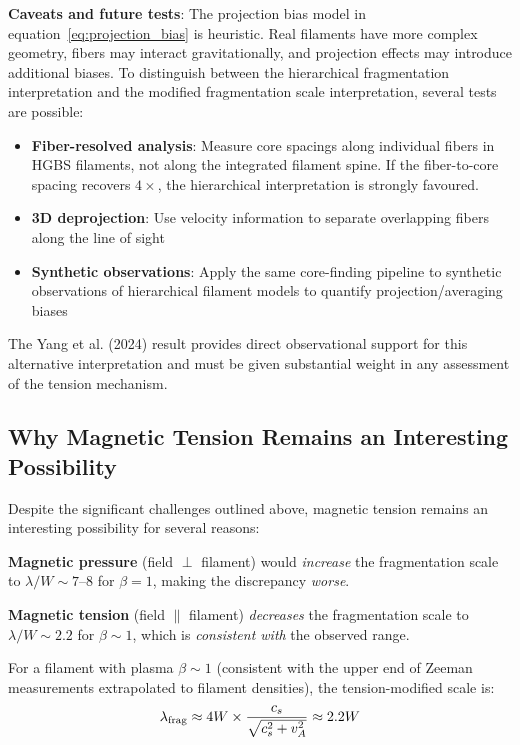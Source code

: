 \documentclass[11pt,a4paper]{article}
\begin{document}
\textbf{Caveats and future tests}: The projection bias model in equation~\ref{eq:projection_bias} is heuristic. Real filaments have more complex geometry, fibers may interact gravitationally, and projection effects may introduce additional biases. To distinguish between the hierarchical fragmentation interpretation and the modified fragmentation scale interpretation, several tests are possible:
\begin{itemize}
    \item \textbf{Fiber-resolved analysis}: Measure core spacings along individual fibers in HGBS filaments, not along the integrated filament spine. If the fiber-to-core spacing recovers $4\times$, the hierarchical interpretation is strongly favoured.
    \item \textbf{3D deprojection}: Use velocity information to separate overlapping fibers along the line of sight
    \item \textbf{Synthetic observations}: Apply the same core-finding pipeline to synthetic observations of hierarchical filament models to quantify projection/averaging biases
\end{itemize}

The Yang et al. (2024) result provides direct observational support for this alternative interpretation and must be given substantial weight in any assessment of the tension mechanism.

\subsection{Why Magnetic Tension Remains an Interesting Possibility}

Despite the significant challenges outlined above, magnetic tension remains an interesting possibility for several reasons:

\textbf{Magnetic pressure} (field $\perp$ filament) would \textit{increase} the fragmentation scale to $\lambda/W \sim 7$--$8$ for $\beta = 1$, making the discrepancy \textit{worse}.

\textbf{Magnetic tension} (field $\parallel$ filament) \textit{decreases} the fragmentation scale to $\lambda/W \sim 2.2$ for $\beta \sim 1$, which is \textit{consistent with} the observed range.

For a filament with plasma $\beta \sim 1$ (consistent with the upper end of Zeeman measurements extrapolated to filament densities), the tension-modified scale is:
\begin{equation}
\lambda_{\rm frag} \approx 4W \times \frac{c_s}{\sqrt{c_s^2 + v_A^2}} \approx 2.2W
\label{eq:tension2}
\end{equation}
\end{document}

